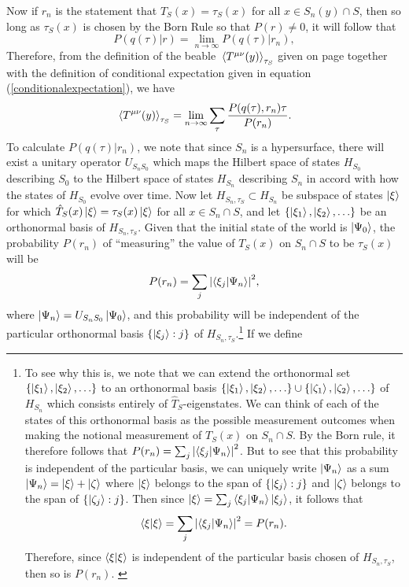  Now if $r_n$ is the statement that  $T_S(x)=\tau_S(x)$ for all $x\in S_n(y)\cap S$, then so long as $\tau_S(x)$ is chosen by the Born Rule so that $P(r)\neq 0$, it will follow that
 \begin{equation}
	P(q(\tau)|r)=\lim_{n\rightarrow\infty}P(q(\tau)|r_n),
 \end{equation}
 Therefore, from the definition of the beable $\ev*{T^{\mu\nu}(y)}_{\tau_S}$ given on page \pageref{Kentbeable} together with the definition of conditional expectation given in equation (\ref{conditionalexpectation}), we have 
\begin{equation}\label{beable1}
\ev*{T^{\mu\nu}(y)}_{\tau_S}=\lim_{n\rightarrow\infty}\sum_\tau\frac{P(q(\tau),r_n)\tau}{P(r_n)}.
\end{equation} 
 To calculate $P(q(\tau)|r_n)$, we note that since $S_n$ is a hypersurface,   there will exist a unitary operator $U_{S_nS_0}$ which maps the Hilbert space of states $H_{S_0}$ describing $S_0$ to the Hilbert space of states $H_{S_n}$\label{HSidef} describing $S_n$ in accord with how the states of $H_{S_0}$  evolve over time. Now let $H_{S_n,\tau_S}\subset H_{S_n}$ be subspace of states $\ket{\xi}$ for which  $\hat{T}_S(x)\ket{\xi}=\tau_S(x)\ket{\xi}$  for all $x\in S_n\cap S$, and  let $\{\ket{\xi_1},\ket{\xi_2},\ldots\}$ be an orthonormal basis of $H_{S_n,\tau_S}$. Given that the initial state of the world is $\ket{\Psi_0}$, the probability $P(r_n)$ of ``measuring'' the value of $T_S(x)$ on $S_n\cap S$ to be $\tau_S(x)$ will be 
\begin{equation}\label{Pri}
P(r_n)=\sum_j \abs{ \ip{\xi_j}{\Psi_n}}^2,
\end{equation}
where $\ket{\Psi_n}=U_{S_nS_0}\ket{\Psi_0}$, and this probability will be independent of the particular orthonormal basis  $\{\ket{\xi_j}:j\}$ of $H_{S_n,\tau_S}$.\footnote{To see why this is, we note that we can extend the orthonormal set $\{\ket{\xi_1},\ket{\xi_2},\ldots\}$ to an orthonormal basis  $\{\ket{\xi_1},\ket{\xi_2},\ldots\}\cup\{\ket{\zeta_1},\ket{\zeta_2},\ldots\}$ of $H_{S_n}$ which consists entirely of $\hat{T}_S$-eigenstates. We can think of each of the states of this orthonormal basis as the possible measurement outcomes when making the notional measurement of $T_S(x)$ on $S_n\cap S$. By the Born rule, it therefore follows that $P(r_n)=\sum_j \abs{ \ip{\xi_j}{\Psi_n}}^2$. But to see that this probability is independent of the particular basis, we can uniquely write $\ket{\Psi_n}$ as a sum $\ket{\Psi_n}=\ket{\xi}+\ket{\zeta}$ where $\ket{\xi}$ belongs to the span of $\{\ket{\xi_j}:j\}$ and $\ket{\zeta}$ belongs to the span of $\{\ket{\zeta_j}:j\}$.  Then since $\ket{\xi}=\sum_j\ip{\xi_j}{\Psi_n}\ket{\xi_j}$, it follows that $$\ip{\xi}{\xi}=\sum_j\abs{ \ip{\xi_j}{\Psi_n}}^2=P(r_n).$$ Therefore, since  $\ip{\xi}{\xi}$ is independent of the particular basis chosen of $H_{S_n,\tau_S}$, then so is $P(r_n)$.  \label{priproof} } If we define 
